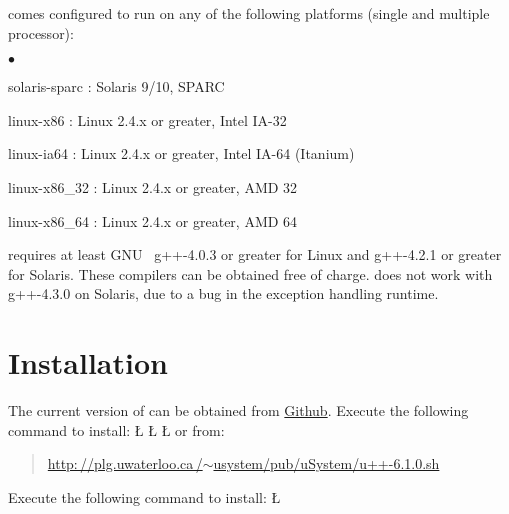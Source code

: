 \documentclass[openright,twoside]{report}
\begin{document}
\uC comes configured to run on any of the following platforms (single and multiple processor):
\begin{list}{$\bullet$}{\parsep=0pt\itemsep=0pt}
\item
solaris-sparc : Solaris 9/10, SPARC
\item
linux-x86 : Linux 2.4.x or greater, Intel IA-32
\item
linux-ia64 : Linux 2.4.x or greater, Intel IA-64 (Itanium)
\item
linux-x86\_32 : Linux 2.4.x or greater, AMD 32
\item
linux-x86\_64 : Linux 2.4.x or greater, AMD 64
\end{list}
\uC requires at least GNU~\cite{GNU-C++} g++-4.0.3 or greater for Linux and g++-4.2.1 or greater for Solaris. %
These compilers can be obtained free of charge.
\uC does not work with g++-4.3.0 on Solaris, due to a bug in the exception handling runtime.


\section{Installation}

The current version of \uC can be obtained from \href{https://github.com/pabuhr/uCPP}{Github}.
Execute the following command to install:
\LGinlinefalse\LGbegin\lgrinde
\L{}
\L{}
\L{}
\endlgrinde\LGend
or from:
\begin{quote}
\href{http://plg.uwaterloo.ca/~usystem/pub/uSystem/u++-6.1.0.sh}{\textsf{http:\,//\hspace{0.1ex}plg.uwaterloo.ca\,/$\sim$usystem/pub/uSystem/u++-6.1.0.sh}}
\end{quote}
Execute the following command to install:
\LGinlinefalse\LGbegin\lgrinde
\L{}
\endlgrinde\LGend
\end{document}
